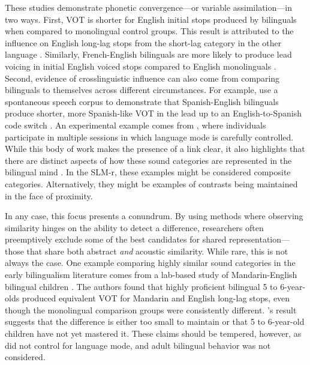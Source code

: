 These studies demonstrate phonetic convergence---or variable assimilation---in two ways. First, VOT is shorter for English initial stops produced by bilinguals when compared to monolingual control groups. This result is attributed to the influence on English long-lag stops from the short-lag category in the other language \citep{olson_2016_transfer, johnson_2021_language}. Similarly, French-English bilinguals are more likely to produce lead voicing in initial English voiced stops compared to English monolinguals \citep{sundara_2006_production}. Second, evidence of crosslinguistic influence can also come from comparing bilinguals to themselves across different circumstances. For example, \citet{fricke_2016_phonetic} use a spontaneous speech corpus to demonstrate that Spanish-English bilinguals produce shorter, more Spanish-like VOT in the lead up to an English-to-Spanish code switch \citep{fricke_2016_phonetic}. An experimental example comes from \citet{simonet_2019_convergence}, where individuals participate in multiple sessions in which language mode is carefully controlled. While this body of work makes the presence of a link clear, it also highlights that there are distinct aspects of how these sound categories are represented in the bilingual mind \citep{casillas_2021_interlingual}. In the SLM-r, these examples might be considered composite categories. Alternatively, they might be examples of contrasts being maintained in the face of proximity.

In any case, this focus presents a conundrum. By using methods where observing similarity hinges on the ability to detect a difference, researchers often preemptively exclude some of the best candidates for shared representation---those that share both abstract \textit{and} acoustic similarity. While rare, this is not always the case. One example comparing highly similar sound categories in the early bilingualism literature comes from a lab-based study of Mandarin-English bilingual children \citep{yang_2019_vot}. The authors found that highly proficient bilingual 5 to 6-year-olds produced equivalent VOT for Mandarin and English long-lag stops, even though the monolingual comparison groups were consistently different. \citeauthor{yang_2019_vot}'s result suggests that the difference is either too small to maintain or that 5 to 6-year-old children have not yet mastered it. These claims should be tempered, however, as \citet{yang_2019_vot} did not control for language mode, and adult bilingual behavior was not considered. 

